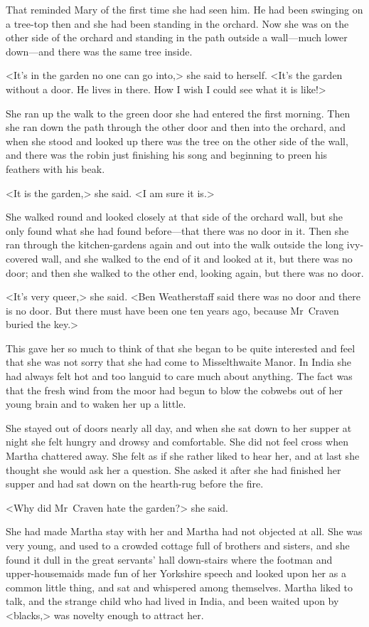 That reminded Mary of the first time she had seen him. He had been swinging on a tree-top then and she had been standing in the orchard. Now she was on the other side of the orchard and standing in the path outside a wall—much lower down—and there was the same tree inside.

<It's in the garden no one can go into,> she said to herself. <It's the garden without a door. He lives in there. How I wish I could see what it is like!>

She ran up the walk to the green door she had entered the first morning. Then she ran down the path through the other door and then into the orchard, and when she stood and looked up there was the tree on the other side of the wall, and there was the robin just finishing his song and beginning to preen his feathers with his beak.

<It is the garden,> she said. <I am sure it is.>

She walked round and looked closely at that side of the orchard wall, but she only found what she had found before—that there was no door in it. Then she ran through the kitchen-gardens again and out into the walk outside the long ivy-covered wall, and she walked to the end of it and looked at it, but there was no door; and then she walked to the other end, looking again, but there was no door.

<It's very queer,> she said. <Ben Weatherstaff said there was no door and there is no door. But there must have been one ten years ago, because Mr~Craven buried the key.>

This gave her so much to think of that she began to be quite interested and feel that she was not sorry that she had come to Misselthwaite Manor. In India she had always felt hot and too languid to care much about anything. The fact was that the fresh wind from the moor had begun to blow the cobwebs out of her young brain and to waken her up a little.

She stayed out of doors nearly all day, and when she sat down to her supper at night she felt hungry and drowsy and comfortable. She did not feel cross when Martha chattered away. She felt as if she rather liked to hear her, and at last she thought she would ask her a question. She asked it after she had finished her supper and had sat down on the hearth-rug before the fire.

<Why did Mr~Craven hate the garden?> she said.

She had made Martha stay with her and Martha had not objected at all. She was very young, and used to a crowded cottage full of brothers and sisters, and she found it dull in the great servants' hall down-stairs where the footman and upper-housemaids made fun of her Yorkshire speech and looked upon her as a common little thing, and sat and whispered among themselves. Martha liked to talk, and the strange child who had lived in India, and been waited upon by <blacks,> was novelty enough to attract her.

